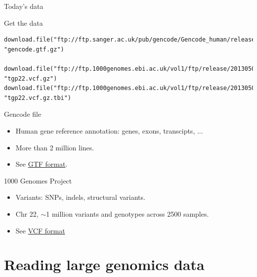 \documentclass[10pt]{beamer}
\begin{document}
\begin{frame}[fragile, shrink=10]{Today's data}
  \begin{exampleblock}{Get the data}
\begin{lstlisting}
download.file("ftp://ftp.sanger.ac.uk/pub/gencode/Gencode_human/release_19/gencode.v19.annotation.gtf.gz", "gencode.gtf.gz")

download.file("ftp://ftp.1000genomes.ebi.ac.uk/vol1/ftp/release/20130502/ALL.chr22.phase3_shapeit2_mvncall_integrated_v5a.20130502.genotypes.vcf.gz", "tgp22.vcf.gz")
download.file("ftp://ftp.1000genomes.ebi.ac.uk/vol1/ftp/release/20130502/ALL.chr22.phase3_shapeit2_mvncall_integrated_v5a.20130502.genotypes.vcf.gz.tbi", "tgp22.vcf.gz.tbi")
\end{lstlisting}
  \end{exampleblock}
  \begin{block}{Gencode file}
    \begin{itemize}
    \item Human gene reference annotation: genes, exons, transcipts, ...
    \item More than 2 million lines.
    \item See \href{http://www.ensembl.org/info/website/upload/gff.html}{GTF format}.
    \end{itemize}
  \end{block}
  \begin{block}{1000 Genomes Project}
    \begin{itemize}
    \item Variants: SNPs, indels, structural variants.
    \item Chr 22, $\sim$1 million variants and genotypes across 2500 samples.
    \item See \href{http://www.internationalgenome.org/wiki/Analysis/vcf4.0/}{VCF format}
    \end{itemize}
  \end{block}
\end{frame}

\section{Reading large genomics data}
\end{document}

